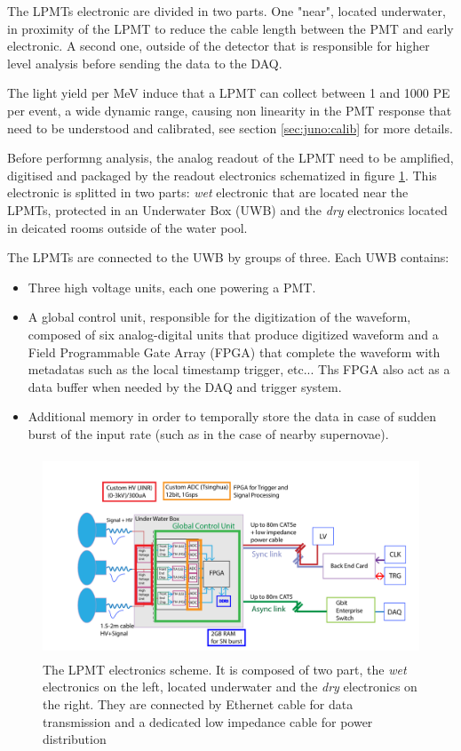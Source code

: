 \documentclass[../main.tex]{subfiles}
\begin{document}
The LPMTs electronic are divided in two parts. One "near", located underwater, in proximity of the LPMT to reduce the cable length between the PMT and early electronic. A second one, outside of the detector that is responsible for higher level analysis before sending the data to the DAQ.

The light yield per MeV induce that a LPMT can collect between 1 and 1000 PE per event, a wide dynamic range,  causing non linearity in the PMT response that need to be understood and calibrated, see section \ref{sec:juno:calib} for more details.

Before performng analysis, the analog readout of the LPMT need to be amplified, digitised and packaged by the readout electronics schematized in figure \ref{fig:juno:lpmt_elec}. This electronic is splitted in two parts: \textit{wet} electronic that are located near the LPMTs, protected in an Underwater Box (UWB) and the \textit{dry} electronics located in deicated rooms outside of the water pool.

The LPMTs are connected to the UWB by groups of three. Each UWB contains:
\begin{itemize}
  \item Three high voltage units, each one powering a PMT.
  \item A global control unit, responsible for the digitization of the waveform, composed of six analog-digital units that produce digitized waveform and a Field Programmable Gate Array (FPGA) that complete the waveform with metadatas such as the local timestamp trigger, etc... Ths FPGA also act as a data buffer when needed by the DAQ and trigger system.
  \item Additional memory in order to temporally store the data in case of sudden burst of the input rate (such as in the case of nearby supernovae).
\end{itemize}

\begin{figure}[ht]
  \centering
  \includegraphics[height=6cm]{images/juno/LPMT_readout.png}
  \caption{The LPMT electronics scheme. It is composed of two part, the \textit{wet} electronics on the left, located underwater and the \textit{dry} electronics on the right. They are connected by Ethernet cable for data transmission and a dedicated low impedance cable for power distribution}
  \label{fig:juno:lpmt_elec}
\end{figure}
\end{document}
